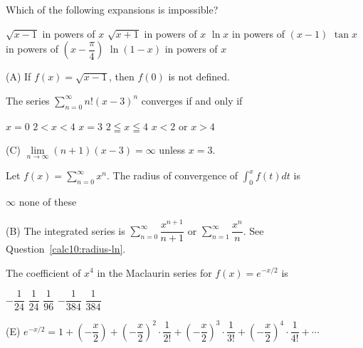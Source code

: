 \newpage




\question
Which of the following expansions is impossible?
\begin{choices}
  \CorrectChoice $\sqrt{x-1}$ in powers of $x$
  \choice $\sqrt{x+1}$ in powers of $x$
  \choice $\ln x$ in powers of $(x-1)$
  \choice $\tan x$ in powers of $\left(x-\dfrac{\pi}{4}\right)$
  \choice $\ln (1-x)$ in powers of $x$
\end{choices}
\begin{solution}
(A) If $f(x)=\sqrt{x-1}$, then $f(0)$ is not defined.
\end{solution}

\question
The series $\sum\limits_{n=0}^{\infty} n!(x-3)^{n}$ converges if and only if
\begin{choices}
  \choice $x=0$
  \choice $2<x<4$
  \CorrectChoice $x=3$
  \choice $2 \leqq x \leqq 4$
  \choice $x<2$ or $x>4$
\end{choices}
\begin{solution}
(C) $\lim\limits_{n \to \infty}(n+1)(x-3)=\infty$ unless $x=3$.
\end{solution}

\question\label{calc10:integral-series}
Let $f(x)=\sum\limits_{n=0}^{\infty} x^{n}$. The radius of convergence of $\displaystyle\int_{0}^{x} f(t) d t$ is
\begin{choices}
  \choice $\infty$
  \choice none of these
\end{choices}
\begin{solution}
(B) The integrated series is $\sum\limits_{n=0}^{\infty} \dfrac{x^{n+1}}{n+1}$ or $\sum\limits_{n=1}^{\infty} \dfrac{x^{n}}{n}$. See Question~\ref{calc10:radius-ln}.
\end{solution}



\newpage




\question
The coefficient of $x^{4}$ in the Maclaurin series for $f(x)=e^{-x / 2}$ is
\begin{choices}
  \choice $-\dfrac{1}{24}$
  \choice $\dfrac{1}{24}$
  \choice $\dfrac{1}{96}$
  \choice $-\dfrac{1}{384}$
  \CorrectChoice $\dfrac{1}{384}$
\end{choices}
\begin{solution}
(E) $e^{-x / 2}=1+\left(-\dfrac{x}{2}\right)+\left(-\dfrac{x}{2}\right)^{2} \cdot \dfrac{1}{2!}+\left(-\dfrac{x}{2}\right)^{3} \cdot \dfrac{1}{3!}+\left(-\dfrac{x}{2}\right)^{4} \cdot \dfrac{1}{4!}+\cdots$
\end{solution}

